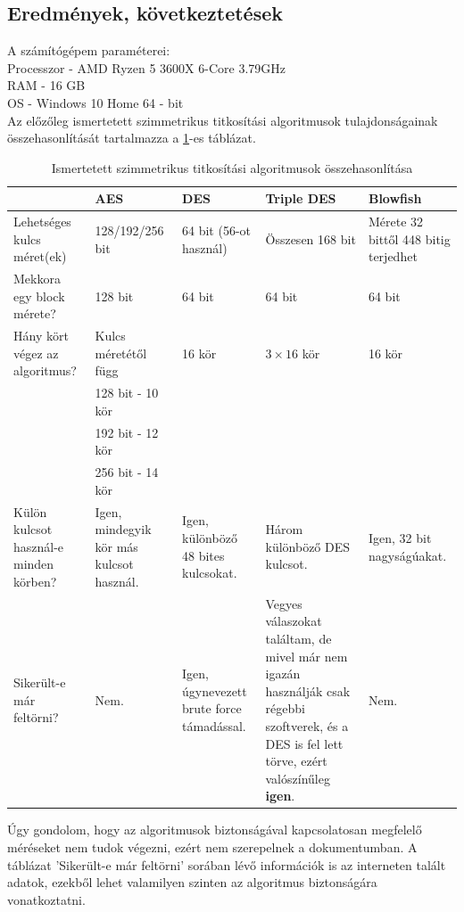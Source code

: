 \subsection{Eredmények, következtetések}
A számítógépem paraméterei:
\\ Processzor - AMD Ryzen 5 3600X 6-Core 3.79GHz
\\ RAM - 16 GB
\\ OS - Windows 10 Home 64 - bit
\vspace{10pt}\\ Az előzőleg ismertetett szimmetrikus titkosítási algoritmusok tulajdonságainak összehasonlítását tartalmazza a \ref{tab:sym_algorithm_comparison}-es táblázat.
\begin{table}[H]
	\centering
	\caption{Ismertetett szimmetrikus titkosítási algoritmusok összehasonlítása}
	\label{tab:sym_algorithm_comparison}
	\medskip
	
	\begin{tabular}{|p{2.4cm}|p{2.7cm}|p{2.7cm}|p{2.7cm}|p{2.7cm}|}
		\hline
		 & \textbf{AES} & \textbf{DES} & \textbf{Triple DES}  & \textbf{Blowfish} \\
		\hline
		Lehetséges kulcs méret(ek) & 128/192/256 bit & 64 bit (56-ot használ) & Összesen 168 bit & Mérete 32 bittől 448 bitig terjedhet \\
		\hline
		Mekkora egy block mérete? & 128 bit & 64 bit & 64 bit & 64 bit \\
		\hline
		Hány kört végez az algoritmus? & Kulcs méretétől függ  & 16 kör & $3 \times 16$ kör & 16 kör \\
		 & 128 bit - 10 kör & & & \\
		 & 192 bit - 12 kör & & & \\
		 & 256 bit - 14 kör & & & \\
		\hline
		Külön kulcsot használ-e minden körben? & Igen, mindegyik kör más kulcsot használ. & Igen, különböző 48 bites kulcsokat. & Három különböző DES kulcsot. & Igen, 32 bit nagyságúakat. \\
		\hline
		Sikerült-e már feltörni? & Nem. & Igen, úgynevezett brute force támadással. & Vegyes válaszokat találtam, de mivel már nem igazán használják csak régebbi szoftverek, és a DES is fel lett törve, ezért valószínűleg \textbf{igen}. & Nem. \\
		\hline
	\end{tabular}
\end{table}
\noindent Úgy gondolom, hogy az algoritmusok biztonságával kapcsolatosan megfelelő méréseket nem tudok végezni, ezért nem szerepelnek a dokumentumban. A táblázat ’Sikerült-e már feltörni’ sorában lévő információk is az interneten talált adatok, ezekből lehet valamilyen szinten az algoritmus biztonságára vonatkoztatni.\newline

